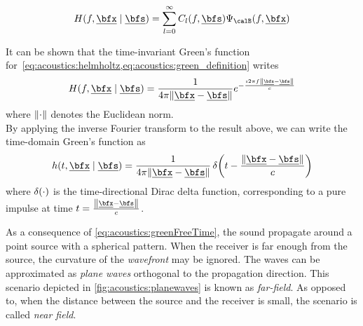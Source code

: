 \begin{equation}
    \label{eq:acoustics:eigenfunction}
    H(f, \positionMicrophone \mid \positionSource) =
        \sum_{l=0}^\infty
            C_l(f, \positionSource)
            \Psi_\boundariesConditions(f, \positionMicrophone)
\end{equation}

It can be shown 
that the time-invariant Green's function for~\cref{eq:acoustics:helmholtz,eq:acoustics:green_definition} writes
\begin{equation}
    \label{eq:acoustics:greenFreeFreq}
    H(f, \positionMicrophone \mid \positionSource) = \frac{1}{4 \pi \norm{\positionMicrophone - \positionSource}} e^{- \frac{\Ii 2 \pi f \norm{\positionMicrophone - \positionSource}}{\speedOfSound}}
\end{equation}
where $\norm{\cdot}$ denotes the Euclidean norm.
\\By applying the inverse Fourier transform to the result above, we can write the time-domain Green's function as
\begin{equation}
    \label{eq:acoustics:greenFreeTime}
    h(t, \positionMicrophone \mid \positionSource) =
        \frac{1}{4 \pi \norm{\positionMicrophone - \positionSource}}
        \diracOf{t - \frac{\norm{\positionMicrophone - \positionSource}}{\speedOfSound}}
\end{equation}
where $\diracOf{\cdot}$ is the time-directional Dirac delta function,
corresponding to a pure impulse at time $t = \tfrac{\norm{\positionMicrophone - \positionSource}}{\speedOfSound}$.

As a consequence of \cref{eq:acoustics:greenFreeTime}, the sound propagate around a point source with a spherical pattern.
When the receiver is far enough from the source, the curvature of the \textit{wavefront} may be ignored.
The waves can be approximated as \textit{plane waves} orthogonal to the propagation direction.
This scenario depicted in \cref{fig:acoustics:planewaves} is known as \textit{far-field}.
As opposed to, when the distance between the source and the receiver is small, the scenario is called \textit{near field}.

